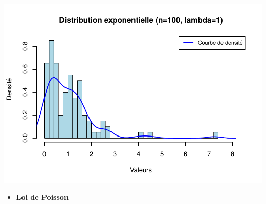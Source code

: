 \documentclass[
  12pt,
]{article}
\providecommand{\tightlist}{%
  \setlength{\itemsep}{0pt}\setlength{\parskip}{0pt}}
\begin{document}
\includegraphics{Stat_non_para_files/figure-latex/unnamed-chunk-4-1.pdf}

\begin{itemize}
\tightlist
\item
  \textbf{Loi de Poisson}
\end{itemize}
\end{document}

